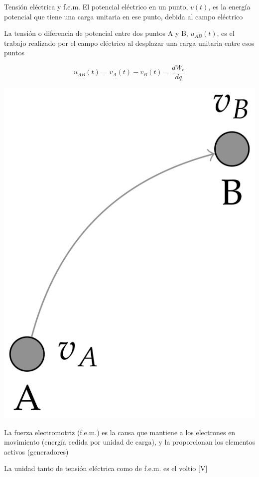 \documentclass[aspectratio=169, xcolor={usenames,svgnames,dvipsnames}]{beamer}
\begin{document}
\begin{frame}{Tensión eléctrica y f.e.m.}
    El \alert{potencial eléctrico en un punto}, \(v(t)\),  es la energía potencial que tiene una carga unitaria en ese punto, debida al campo eléctrico
    
    La \alert{tensión} o \alert{diferencia de potencial entre dos puntos} A y B, \(u_{AB}(t)\), es el trabajo realizado por el campo eléctrico al desplazar una carga unitaria entre esos puntos
    
    \begin{minipage}[c]{0.5\linewidth}
    \begin{equation*}
      u_{AB}(t) = v_A(t) - v_B(t) = \frac{dW_{e}}{dq}
    \end{equation*}
    \end{minipage}
    \hfill
    \begin{minipage}[c]{0.4\linewidth}
    \begin{center}
    \includegraphics[height=0.3\textheight]{../figs/tension_puntos.PNG}
    \end{center}
    \end{minipage}
    
    La \alert{fuerza electromotriz} (f.e.m.) es la causa que mantiene a los electrones en movimiento (energía cedida por unidad de carga), y la proporcionan los elementos activos (\alert{generadores})
    
    La \alert{unidad} tanto de tensión eléctrica como de f.e.m. es el \alert{voltio} [V]
\end{frame}
\end{document}
